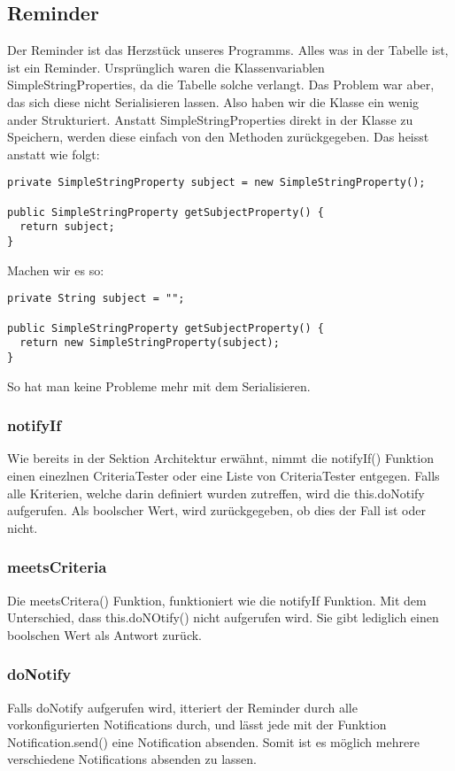 \subsection{Reminder}
Der Reminder ist das Herzstück unseres Programms. Alles was in der Tabelle ist, ist ein Reminder. Ursprünglich waren die Klassenvariablen SimpleStringProperties, da die Tabelle
solche verlangt. Das Problem war aber, das sich diese nicht Serialisieren lassen. Also haben wir die Klasse ein wenig ander Strukturiert. Anstatt SimpleStringProperties
direkt in der Klasse zu Speichern, werden diese einfach von den Methoden zurückgegeben.
Das heisst anstatt wie folgt:
\begin{lstlisting}
private SimpleStringProperty subject = new SimpleStringProperty();

public SimpleStringProperty getSubjectProperty() {
  return subject;
}
\end{lstlisting}

Machen wir es so:
\begin{lstlisting}
private String subject = "";

public SimpleStringProperty getSubjectProperty() {
  return new SimpleStringProperty(subject);
}
\end{lstlisting}
So hat man keine Probleme mehr mit dem Serialisieren.

\subsubsection{notifyIf}
Wie bereits in der Sektion  Architektur erwähnt, nimmt die notifyIf() Funktion einen einezlnen CriteriaTester oder eine  Liste von  CriteriaTester entgegen. Falls alle Kriterien, welche darin definiert wurden zutreffen, wird die this.doNotify aufgerufen. Als boolscher Wert, wird zurückgegeben, ob dies der Fall ist oder nicht.
\subsubsection{meetsCriteria}
Die meetsCritera() Funktion,  funktioniert wie die notifyIf Funktion. Mit dem Unterschied, dass this.doNOtify() nicht aufgerufen wird. Sie gibt lediglich einen boolschen Wert als Antwort zurück.

\subsubsection{doNotify}
Falls  doNotify aufgerufen wird, itteriert der Reminder durch alle vorkonfigurierten Notifications durch, und lässt jede mit der Funktion Notification.send() eine Notification absenden. Somit ist es möglich mehrere verschiedene Notifications absenden zu lassen.


